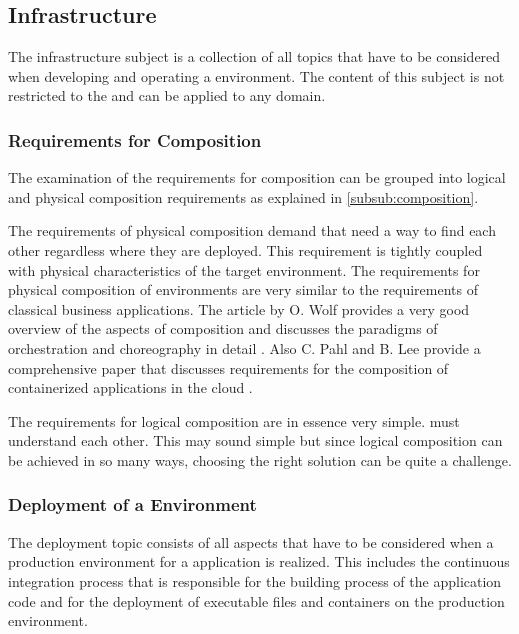 \subsection{\ms{} Infrastructure}
\label{sub:infrastructure}

The \ms{} infrastructure subject is a collection of all topics that have to be
considered when developing and operating a \ms{} environment. The content of
this subject is not restricted to the \ogs{} and can be applied to any domain. 

\subsubsection{Requirements for \ms{} Composition}

The examination of the requirements for \ms{} composition can be grouped into
logical and physical composition requirements as explained in
\autoref{subsub:composition}.

The requirements of physical composition demand that \mss{} need a way to find
each other regardless where they are deployed. This requirement is tightly
coupled with physical characteristics of the target environment. The
requirements for physical composition of \ms{} \og{} environments are very
similar to the requirements of classical business applications. The article by
O. Wolf provides a very good overview of the aspects of \ms{} composition and
discusses the paradigms of orchestration and choreography in detail
\cite{wolf_ms}. Also C. Pahl and B. Lee provide a comprehensive paper that
discusses requirements for the composition of containerized applications in the
cloud \cite{pahl2015containers}.

The requirements for logical composition are in essence very simple. \mss{} must
understand each other. This may sound simple but since logical composition can
be achieved in so many ways, choosing the right solution can be quite a
challenge.

\subsubsection{Deployment of a \ms{} Environment}

The deployment topic consists of all aspects that have to be considered when a
production environment for a \ms{} application is realized. This includes the
continuous integration process that is responsible for the building process of
the application code and for the deployment of executable files and containers
on the production environment.


